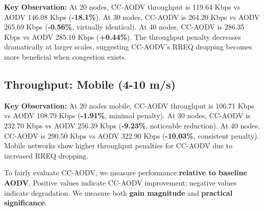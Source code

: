 \documentclass[12pt]{article}
\begin{document}
\textbf{Key Observation:} At 20 nodes, CC-AODV throughput is 119.64 Kbps vs AODV 146.08 Kbps (\textbf{-18.1\%}). At 30 nodes, CC-AODV is 264.20 Kbps vs AODV 265.69 Kbps (\textbf{-0.56\%}, virtually identical). At 40 nodes, CC-AODV is 286.35 Kbps vs AODV 285.10 Kbps (\textbf{+0.44\%}). The throughput penalty decreases dramatically at larger scales, suggesting CC-AODV's RREQ dropping becomes more beneficial when congestion exists.

\pagebreak

\subsection*{Throughput: Mobile (4-10 m/s)}

\begin{center}
\end{center}

\textbf{Key Observation:} At 20 nodes mobile, CC-AODV throughput is 106.71 Kbps vs AODV 108.79 Kbps (\textbf{-1.91\%}, minimal penalty). At 30 nodes, CC-AODV is 232.70 Kbps vs AODV 256.39 Kbps (\textbf{-9.23\%}, noticeable reduction). At 40 nodes, CC-AODV is 290.50 Kbps vs AODV 322.90 Kbps (\textbf{-10.03\%}, consistent penalty). Mobile networks show higher throughput penalties for CC-AODV due to increased RREQ dropping.

\pagebreak

To fairly evaluate CC-AODV, we measure performance \textbf{relative to baseline AODV}. Positive values indicate CC-AODV improvement; negative values indicate degradation. We measure both \textbf{gain magnitude} and \textbf{practical significance}.
\end{document}
